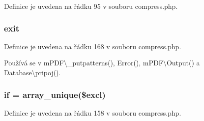 Definice je uvedena na řádku 95 v souboru compress.\-php.

\hypertarget{compress_8php_a6733eb5f605d09eaede9845835d71c4e}{
\subsubsection[{exit}]{\setlength{\rightskip}{0pt plus 5cm}exit}}\label{compress_8php_a6733eb5f605d09eaede9845835d71c4e}


Definice je uvedena na řádku 168 v souboru compress.\-php.



Používá se v m\-P\-D\-F\textbackslash{}\-\_\-putpatterns(), Error(), m\-P\-D\-F\textbackslash{}\-Output() a Database\textbackslash{}pripoj().

\hypertarget{compress_8php_a0ad06318b1464b4cece76cd1bb53ca79}{
\subsubsection[{if}]{\setlength{\rightskip}{0pt plus 5cm}if = array\-\_\-unique(\$excl)}}\label{compress_8php_a0ad06318b1464b4cece76cd1bb53ca79}


Definice je uvedena na řádku 158 v souboru compress.\-php.

